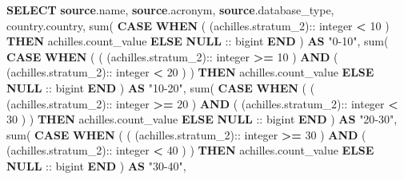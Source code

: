 \documentclass[
]{book}
\newenvironment{Shaded}{\begin{snugshade}}{\end{snugshade}}
\newcommand{\ControlFlowTok}[1]{\textcolor[rgb]{0.13,0.29,0.53}{\textbf{#1}}}
\newcommand{\DataTypeTok}[1]{\textcolor[rgb]{0.13,0.29,0.53}{#1}}
\newcommand{\DecValTok}[1]{\textcolor[rgb]{0.00,0.00,0.81}{#1}}
\newcommand{\FunctionTok}[1]{\textcolor[rgb]{0.00,0.00,0.00}{#1}}
\newcommand{\KeywordTok}[1]{\textcolor[rgb]{0.13,0.29,0.53}{\textbf{#1}}}
\newcommand{\NormalTok}[1]{#1}
\newcommand{\OperatorTok}[1]{\textcolor[rgb]{0.81,0.36,0.00}{\textbf{#1}}}
\newcommand{\OtherTok}[1]{\textcolor[rgb]{0.56,0.35,0.01}{#1}}
\begin{document}
\begin{Shaded}
\begin{Highlighting}[]
\KeywordTok{SELECT} \KeywordTok{source}\NormalTok{.name,}
   \KeywordTok{source}\NormalTok{.acronym,}
   \KeywordTok{source}\NormalTok{.database\_type,}
\NormalTok{   country.country,}
   \FunctionTok{sum}\NormalTok{(}
     \ControlFlowTok{CASE} \ControlFlowTok{WHEN}\NormalTok{ (}
\NormalTok{       (achilles.stratum\_2):: }\DataTypeTok{integer} \OperatorTok{\textless{}} \DecValTok{10}
\NormalTok{     ) }\ControlFlowTok{THEN}\NormalTok{ achilles.count\_value }\ControlFlowTok{ELSE} \KeywordTok{NULL}\NormalTok{ :: bigint }\ControlFlowTok{END}
\NormalTok{   ) }\KeywordTok{AS} \OtherTok{"0{-}10"}\NormalTok{, }
   \FunctionTok{sum}\NormalTok{(}
     \ControlFlowTok{CASE} \ControlFlowTok{WHEN}\NormalTok{ (}
\NormalTok{       (}
\NormalTok{         (achilles.stratum\_2):: }\DataTypeTok{integer} \OperatorTok{\textgreater{}=} \DecValTok{10}
\NormalTok{       ) }
       \KeywordTok{AND}\NormalTok{ (}
\NormalTok{         (achilles.stratum\_2):: }\DataTypeTok{integer} \OperatorTok{\textless{}} \DecValTok{20}
\NormalTok{       )}
\NormalTok{     ) }\ControlFlowTok{THEN}\NormalTok{ achilles.count\_value }\ControlFlowTok{ELSE} \KeywordTok{NULL}\NormalTok{ :: bigint }\ControlFlowTok{END}
\NormalTok{   ) }\KeywordTok{AS} \OtherTok{"10{-}20"}\NormalTok{, }
   \FunctionTok{sum}\NormalTok{(}
     \ControlFlowTok{CASE} \ControlFlowTok{WHEN}\NormalTok{ (}
\NormalTok{       (}
\NormalTok{         (achilles.stratum\_2):: }\DataTypeTok{integer} \OperatorTok{\textgreater{}=} \DecValTok{20}
\NormalTok{       ) }
       \KeywordTok{AND}\NormalTok{ (}
\NormalTok{         (achilles.stratum\_2):: }\DataTypeTok{integer} \OperatorTok{\textless{}} \DecValTok{30}
\NormalTok{       )}
\NormalTok{     ) }\ControlFlowTok{THEN}\NormalTok{ achilles.count\_value }\ControlFlowTok{ELSE} \KeywordTok{NULL}\NormalTok{ :: bigint }\ControlFlowTok{END}
\NormalTok{   ) }\KeywordTok{AS} \OtherTok{"20{-}30"}\NormalTok{, }
   \FunctionTok{sum}\NormalTok{(}
     \ControlFlowTok{CASE} \ControlFlowTok{WHEN}\NormalTok{ (}
\NormalTok{       (}
\NormalTok{         (achilles.stratum\_2):: }\DataTypeTok{integer} \OperatorTok{\textgreater{}=} \DecValTok{30}
\NormalTok{       ) }
       \KeywordTok{AND}\NormalTok{ (}
\NormalTok{         (achilles.stratum\_2):: }\DataTypeTok{integer} \OperatorTok{\textless{}} \DecValTok{40}
\NormalTok{       )}
\NormalTok{     ) }\ControlFlowTok{THEN}\NormalTok{ achilles.count\_value }\ControlFlowTok{ELSE} \KeywordTok{NULL}\NormalTok{ :: bigint }\ControlFlowTok{END}
\NormalTok{   ) }\KeywordTok{AS} \OtherTok{"30{-}40"}\NormalTok{, }

\end{Highlighting}
\end{Shaded}
\end{document}
